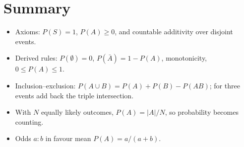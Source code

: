 \section{Summary}

\begin{itemize}
  \item Axioms: $P(S)=1$, $P(A)\ge0$, and countable additivity over disjoint events.
  \item Derived rules: $P(\emptyset)=0$, $P(\bar A) = 1 - P(A)$, monotonicity,
        $0\le P(A) \le 1$.
  \item Inclusion--exclusion: $P(A\cup B) = P(A)+P(B)-P(AB)$; for three events add back
        the triple intersection.
  \item With $N$ equally likely outcomes, $P(A) = |A|/N$, so probability becomes counting.
  \item Odds $a:b$ in favour mean $P(A) = a/(a+b)$.
\end{itemize}
